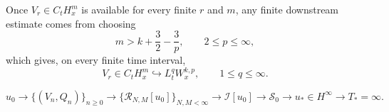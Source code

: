 Once \(V_r\in C_tH_x^m\) is available for every finite \(r\) and \(m\), any
finite downstream estimate comes from choosing
\[
m>k+\frac32-\frac3p,
\qquad
2\le p\le\infty,
\]
which gives, on every finite time interval,
\[
V_r\in C_tH_x^m
\hookrightarrow L_t^qW_x^{k,p},
\qquad 1\le q\le\infty.
\]

\[
u_0
\longrightarrow \{(V_n,Q_n)\}_{n\ge0}
\longrightarrow \{\mathcal R_{N,M}[u_0]\}_{N,M<\infty}
\longrightarrow \mathcal I[u_0]
\longrightarrow \mathscr S_0
\longrightarrow u_*\in H^\infty
\longrightarrow T_*=\infty.
\]
